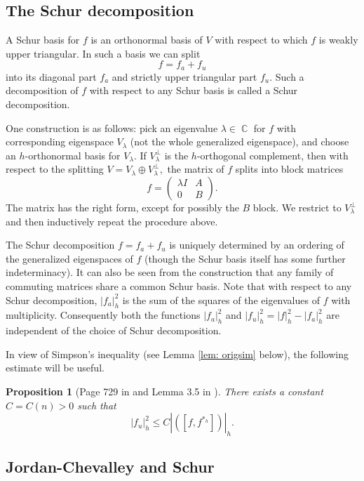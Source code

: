 \documentclass[10pt]{amsart}
\newtheorem{prop}[thm]{Proposition}
\theoremstyle{definition}
\DeclareMathOperator{\C}{\mathbb{C}}
\begin{document}
\subsection{The Schur decomposition}\label{schurdec} A Schur basis for $f$ is an orthonormal basis of $V$ with respect to which $f$ is weakly upper triangular. In such a basis we can split
\[
f = f_a + f_u
\]
into its diagonal part $f_a$ and strictly upper triangular part $f_u$. Such a decomposition of $f$ with respect to any Schur basis is called a Schur decomposition. 

One construction is as follows: pick an eigenvalue $\lambda\in \C$ for $f$ with corresponding eigenspace $V_\lambda$ (not the whole generalized eigenspace), and choose an $h$-orthonormal basis for $V_\lambda$. If $V_\lambda^\perp$ is the $h$-orthogonal complement, then with respect to the splitting $V=V_\lambda\oplus V_\lambda^\perp,$ the matrix of $f$ splits into block matrices $$f=\begin{pmatrix} \lambda I & A \\
0 & B\end{pmatrix}.$$ The matrix has the right form, except for possibly the $B$ block. We restrict to $V_\lambda^\perp$ and then inductively repeat the procedure above. 

The Schur decomposition $f = f_a + f_u$ is uniquely determined by an ordering of the generalized eigenspaces of $f$ (though the Schur basis itself has some further indeterminacy). It can also be seen from the construction that any family of commuting matrices share a common Schur basis. Note that with respect to any Schur decomposition, $|f_a|_h^2$ is the sum of the squares of the eigenvalues of $f$ with multiplicity. Consequently both the functions $|f_a|^2_h$ and $|f_u|^2_h = |f|^2_h - |f_a|^2_h$ are independent of the choice of Schur decomposition.

In view of Simpson's inequality (see Lemma \ref{lem: origsim} below), the following estimate will be useful.
      \begin{prop}[Page 729 in \cite{S} and Lemma 3.5 in \cite{LM1}]\label{SMprop}
        There exists a constant $C=C(n)>0$ such that 
        \begin{equation}\label{SM}
            |f_u|_h^2\leq C|([f,f^{*_h}])|_h.
        \end{equation}
    \end{prop}

\subsection{Jordan-Chevalley and Schur} 
\end{document}
